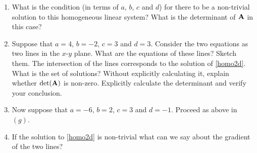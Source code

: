 {\begin{enumerate}
Consider the homogeneous linear system ${\bf A}{\bf x}= {\bf 0}$:
\begin{equation} \label{homo2d}
 \begin{pmatrix}
  a & b \\ c & d
 \end{pmatrix}
\begin{pmatrix}
 x \\ y
\end{pmatrix}
=
\begin{pmatrix}
 0 \\ 0
\end{pmatrix}.
\end{equation}
 \item  What is the condition (in terms of $a$, $b$, $c$ and $d$) for there to be a non-trivial solution to this homogeneous linear system? What is the determinant of ${\bf A}$ in this case?
 \item Suppose that $a=4$, $b=-2$, $c=3$ and $d=3$. Consider the two equations as two lines in the $x$-$y$ plane. What are the equations of these lines? Sketch them. The intersection of the lines corresponds to the solution of \eqref{homo2d}. What is the set of solutions? Without explicitly calculating it, explain whether $\text{det}({\bf A})$ is non-zero. Explicitly calculate the determinant and verify your conclusion.
  \item Now suppose that $a=-6$, $b=2$, $c=3$ and $d=-1$. Proceed as above in $(g)$.
 \item If the solution to \eqref{homo2d} is non-trivial what can we say about the gradient of the two lines?
\end{enumerate}
 }

